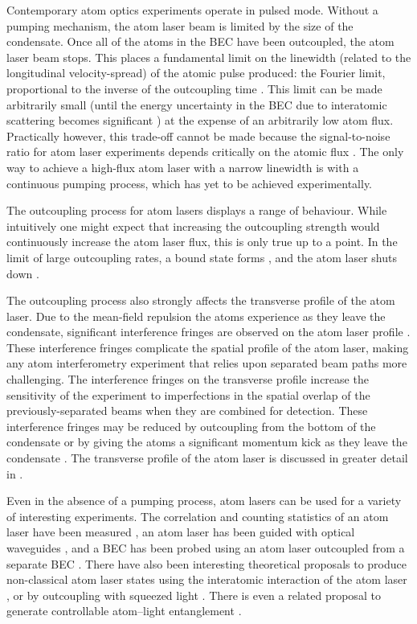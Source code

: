 Contemporary atom optics experiments operate in pulsed mode.  Without a pumping mechanism, the atom laser beam is limited by the size of the condensate.  Once all of the atoms in the BEC have been outcoupled, the atom laser beam stops.  This places a fundamental limit on the linewidth (related to the longitudinal velocity-spread) of the atomic pulse produced: the Fourier limit, proportional to the inverse of the outcoupling time \citep{Johnsson:2007}.  This limit can be made arbitrarily small (until the energy uncertainty in the BEC due to interatomic scattering becomes significant \cite{Johnsson:2007a}) at the expense of an arbitrarily low atom flux.  Practically however, this trade-off cannot be made because the signal-to-noise ratio for atom laser experiments depends critically on the atomic flux \citep{Dowling:1998}.  The only way to achieve a high-flux atom laser with a narrow linewidth is with a continuous pumping process, which has yet to be achieved experimentally. 

The outcoupling process for atom lasers displays a range of behaviour.  While intuitively one might expect that increasing the outcoupling strength would continuously increase the atom laser flux, this is only true up to a point.  In the limit of large outcoupling rates, a bound state forms \citep{Jeffers:2000rr}, and the atom laser shuts down \citep{Robins:2004pz}.  

The outcoupling process also strongly affects the transverse profile of the atom laser.  Due to the mean-field repulsion the atoms experience as they leave the condensate, significant interference fringes are observed on the atom laser profile \citep{Busch:2002zr,Kohl:2005}.  These interference fringes complicate the spatial profile of the atom laser, making any atom interferometry experiment that relies upon separated beam paths more challenging.  The interference fringes on the transverse profile increase the sensitivity of the experiment to imperfections in the spatial overlap of the previously-separated beams when they are combined for detection.  These interference fringes may be reduced by outcoupling from the bottom of the condensate \citep{Riou:2006uq} or by giving the atoms a significant momentum kick as they leave the condensate \citep{Jeppesen:2008}.  The transverse profile of the atom laser is discussed in greater detail in .

Even in the absence of a pumping process, atom lasers can be used for a variety of interesting experiments.  The correlation and counting statistics of an atom laser have been measured \citep{Ottl:2005}, an atom laser has been guided with optical waveguides \citep{Guerin:2006mz}, and a BEC has been probed using an atom laser outcoupled from a separate BEC \citep{Doring:2008}.  There have also been interesting theoretical proposals to produce non-classical atom laser states using the interatomic interaction of the atom laser \citep{Johnsson:2007b}, or by outcoupling with squeezed light \citep{Haine:2005}.  There is even a related proposal to generate controllable atom--light entanglement \citep{Haine:2006}.

